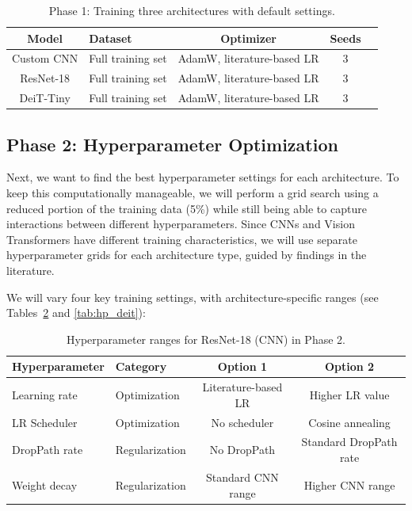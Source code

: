 \documentclass[12pt,a4paper]{article}
\begin{document}
\begin{table}[H]
\centering
\caption{Phase 1: Training three architectures with default settings.}
\label{tab:phase1}
\begin{tabular}{@{}clccc@{}}
\toprule
\textbf{Model} & \textbf{Dataset} & \textbf{Optimizer} & \textbf{Seeds} \\
\midrule
Custom CNN & Full training set & AdamW, literature-based LR & 3 \\
ResNet-18  & Full training set & AdamW, literature-based LR & 3 \\
DeiT-Tiny  & Full training set & AdamW, literature-based LR & 3 \\
\bottomrule
\end{tabular}
\end{table}

\subsection{Phase 2: Hyperparameter Optimization}

Next, we want to find the best hyperparameter settings for each architecture. To keep this computationally manageable, we will perform a grid search using a reduced portion of the training data (5\%) while still being able to capture interactions between different hyperparameters. Since CNNs and Vision Transformers have different training characteristics, we will use separate hyperparameter grids for each architecture type, guided by findings in the literature.

We will vary four key training settings, with architecture-specific ranges (see Tables~\ref{tab:hp_resnet} and \ref{tab:hp_deit}):

\begin{table}[H]
\centering
\caption{Hyperparameter ranges for ResNet-18 (CNN) in Phase 2.}
\label{tab:hp_resnet}
\begin{tabular}{@{}llcc@{}}
\toprule
\textbf{Hyperparameter} & \textbf{Category} & \textbf{Option 1} & \textbf{Option 2} \\
\midrule
Learning rate & Optimization & Literature-based LR & Higher LR value \\
LR Scheduler & Optimization & No scheduler & Cosine annealing \\
DropPath rate & Regularization & No DropPath & Standard DropPath rate \\
Weight decay & Regularization & Standard CNN range & Higher CNN range \\
\bottomrule
\end{tabular}
\end{table}
\end{document}
